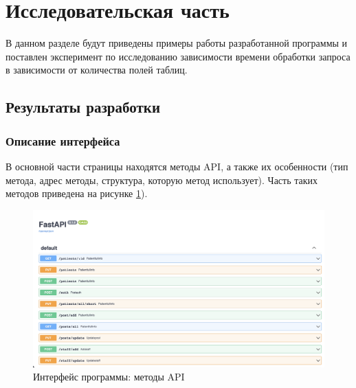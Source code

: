 \section{Исследовательская часть}
\label{cha:research}

В данном разделе будут приведены примеры работы разработанной программы и поставлен эксперимент по исследованию зависимости времени обработки запроса в зависимости от количества полей таблиц. 

\subsection{Результаты разработки}

\subsubsection{Описание интерфейса}

В основной части страницы находятся методы API, а также их особенности (тип метода, адрес методы, структура, которую метод использует). Часть таких методов приведена на рисунке \ref{fig:interface-1}). 
\begin{figure}[h]
	\centering
	\captionsetup{justification=centering}
	\includegraphics[width=170mm]{img/interface.png}
	\caption{Интерфейс программы: методы API}
	\label{fig:interface-1}
\end{figure}

